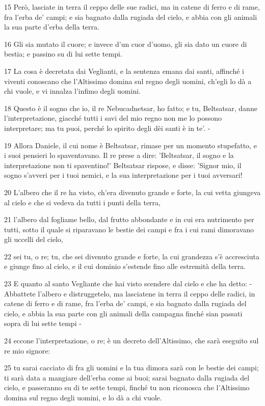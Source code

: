 \par 15 Però, lasciate in terra il ceppo delle sue radici, ma in catene di ferro e di rame, fra l'erba de' campi; e sia bagnato dalla rugiada del cielo, e abbia con gli animali la sua parte d'erba della terra.
\par 16 Gli sia mutato il cuore; e invece d'un cuor d'uomo, gli sia dato un cuore di bestia; e passino su di lui sette tempi.
\par 17 La cosa è decretata dai Veglianti, e la sentenza emana dai santi, affinché i viventi conoscano che l'Altissimo domina sul regno degli uomini, ch'egli lo dà a chi vuole, e vi innalza l'infimo degli uomini.
\par 18 Questo è il sogno che io, il re Nebucadnetsar, ho fatto; e tu, Beltsatsar, danne l'interpretazione, giacché tutti i savi del mio regno non me lo possono interpretare; ma tu puoi, perché lo spirito degli dèi santi è in te'. -
\par 19 Allora Daniele, il cui nome è Beltsatsar, rimase per un momento stupefatto, e i suoi pensieri lo spaventavano. Il re prese a dire: 'Beltsatsar, il sogno e la interpretazione non ti spaventino!' Beltsatsar rispose, e disse: 'Signor mio, il sogno s'avveri per i tuoi nemici, e la sua interpretazione per i tuoi avversari!
\par 20 L'albero che il re ha visto, ch'era divenuto grande e forte, la cui vetta giungeva al cielo e che si vedeva da tutti i punti della terra,
\par 21 l'albero dal fogliame bello, dal frutto abbondante e in cui era nutrimento per tutti, sotto il quale si riparavano le bestie dei campi e fra i cui rami dimoravano gli uccelli del cielo,
\par 22 sei tu, o re; tu, che sei divenuto grande e forte, la cui grandezza s'è accresciuta e giunge fino al cielo, e il cui dominio s'estende fino alle estremità della terra.
\par 23 E quanto al santo Vegliante che hai visto scendere dal cielo e che ha detto: - Abbattete l'albero e distruggetelo, ma lasciatene in terra il ceppo delle radici, in catene di ferro e di rame, fra l'erba de' campi, e sia bagnato dalla rugiada del cielo, e abbia la sua parte con gli animali della campagna finché sian passati sopra di lui sette tempi -
\par 24 eccone l'interpretazione, o re; è un decreto dell'Altissimo, che sarà eseguito sul re mio signore:
\par 25 tu sarai cacciato di fra gli uomini e la tua dimora sarà con le bestie dei campi; ti sarà data a mangiare dell'erba come ai buoi; sarai bagnato dalla rugiada del cielo, e passeranno su di te sette tempi, finché tu non riconosca che l'Altissimo domina sul regno degli uomini, e lo dà a chi vuole.
